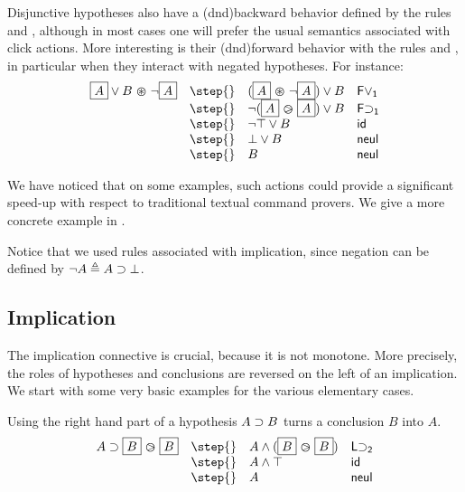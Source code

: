 Disjunctive hypotheses also have a \kl(dnd){backward} behavior defined by the rules
 and , although in most cases one will prefer the
usual  semantics associated with click actions. More interesting is
their \kl(dnd){forward} behavior with the rules  and , in
particular when they interact with negated hypotheses. For instance:
$$
\begin{array}{llll}
  \select{A} \lor B \forw \neg \select{A}
    & \step{} & (\select{A} \forw \neg\select{A}) \lor B &\mathsf{F\lor_1}\\
    & \step{} & \neg (\select{A} \back \select{A}) \lor B &\mathsf{F{\limp}_1}\\
    & \step{} & \neg \top \lor B &\mathsf{id}\\
    & \step{} & \bot \lor B &\mathsf{neul}\\
    & \step{} & B &\mathsf{neul}\\
\end{array}
$$

We have noticed that on some examples, such actions could provide a
significant speed-up with respect to traditional textual command
provers. We give a more concrete example in .

Notice that we used rules associated with implication, since negation can be
defined by $\neg A \triangleq A \supset \bot$.

\subsection{Implication}
The implication connective is crucial, because it is not monotone. More
precisely, the roles of hypotheses and conclusions are reversed on the
left of an implication. We start with some very basic examples
for the various elementary cases.

Using the right hand part of a hypothesis $A\supset B$ turns a 
conclusion $B$ into $A$. 
$$
\begin{array}{llll}
  A\limp \select{B} \back \select{B} &\step{}& A\land (\select{B}
                                                \back
                                                \select{B})&\mathsf{L
                                                             {\limp}_2}\\
                                         &\step{}&A\land\top & \mathsf{id}\\
    &\step{}& A&\mathsf{neul}
\end{array}
$$

